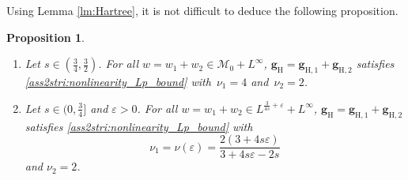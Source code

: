 \documentclass[12pt,a4paper]{amsart}
\newtheorem{prop}[theorem]{Proposition}
\numberwithin{equation}{section}
\newcommand{\ulg}{\boldsymbol{g}}
\begin{document}
	Using Lemma \ref{lm:Hartree}, it is not difficult to deduce the following proposition.
	
	\begin{prop}\label{prop:Hartree(N2)}$ $
		\begin{enumerate}[label=\roman*)]
			\item Let $s\in(\frac34,\frac32)$. For all $w=w_1+w_2\in\mathcal{M}_0+L^\infty$, $\ulg_{\mathrm{H}}=\ulg_{\mathrm{H},1}+\ulg_{\mathrm{H},2}$ satisfies \ref{ass2stri:nonlinearity_Lp_bound} with~$\nu_1=4$ and~$\nu_2=2$.
			\item Let $s\in(0,\frac34]$ and $\varepsilon>0$. For all $w=w_1+w_2\in L^{\frac{3}{4s}+\varepsilon}+L^\infty$, $\ulg_{\mathrm{H}}=\ulg_{\mathrm{H},1}+\ulg_{\mathrm{H},2}$ satisfies \ref{ass2stri:nonlinearity_Lp_bound} with 
			\begin{equation}\label{eq:nu(epsilon)}
				\nu_1=\nu(\varepsilon) = \frac{2(3+4s\varepsilon)}{3+4s\varepsilon-2s}
			\end{equation}
			and $\nu_2=2$.
		\end{enumerate}
	\end{prop}
	
\end{document}
